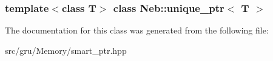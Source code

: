 \subsubsection*{template$<$class \-T$>$ class Neb\-::unique\-\_\-ptr$<$ T $>$}



\-The documentation for this class was generated from the following file\-:\begin{DoxyCompactItemize}
\item 
src/gru/\-Memory/smart\-\_\-ptr.\-hpp\end{DoxyCompactItemize}
